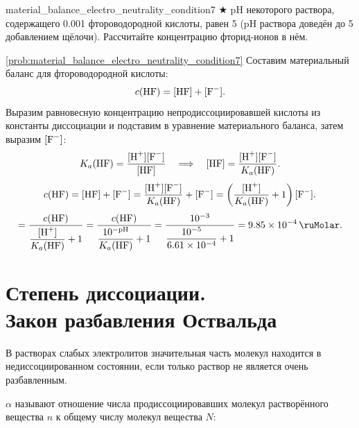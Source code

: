 \begin{problem}{}{material_balance_electro_neutrality_condition7}
    $\bigstar$ pH некоторого раствора, содержащего \qty{0,001}{\ruMolar} фтороводородной кислоты, равен 5 (pH раствора доведён до 5 добавлением щёлочи). Рассчитайте концентрацию фторид-ионов в нём.
    \begin{sol}{\ref{prob:material_balance_electro_neutrality_condition7}}
        Составим материальный баланс для фтороводородной кислоты:
        \begin{equation*}
            c(\ce{HF}) = [\ce{HF}] + [\ce{F^-}].
        \end{equation*}
        Выразим равновесную концентрацию непродиссоциировавшей кислоты из константы диссоциации и подставим в уравнение материального баланса, затем выразим $[\ce{F^-}]$:
        \begin{equation*}
            K_a(\ce{HF}) = \frac{[\ce{H^+}][\ce{F^-}]}{[\ce{HF}]}
            \quad\Longrightarrow\quad
            [\ce{HF}] = \frac{[\ce{H^+}][\ce{F^-}]}{K_a(\ce{HF})}.
        \end{equation*}
        \begin{equation*}
            c(\ce{HF}) = [\ce{HF}] + [\ce{F^-}]
            = \frac{[\ce{H^+}][\ce{F^-}]}{K_a(\ce{HF})} + [\ce{F^-}]
            = \left(\frac{[\ce{H^+}]}{K_a(\ce{HF})} + 1\right)[\ce{F^-}].
        \end{equation*}
        \begin{equation*}
            [\ce{F^-}] = \frac{c(\ce{HF})}{\dfrac{[\ce{H^+}]}{K_a(\ce{HF})} + 1}
            = \frac{c(\ce{HF})}{\dfrac{10^{-\text{pH}}}{K_a(\ce{HF})} + 1}
            = \frac{\num{e-3}}{\dfrac{\num{e-5}}{\num{6,61e-4}} + 1}
            = \qty{9,85e-4}{\ruMolar}.
        \end{equation*}
    \end{sol}
\end{problem}

\clearpage

\section[Степень диссоциации]{Степень диссоциации.\\Закон разбавления Оствальда}

В растворах слабых электролитов значительная часть молекул находится в недиссоциированном состоянии, если только раствор не является очень разбавленным.

 $\alpha$ называют отношение числа продиссоциировавших молекул растворённого вещества $n$ к общему числу молекул вещества $N$:

